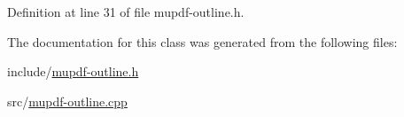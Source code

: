 Definition at line 31 of file mupdf-\/outline.\-h.



The documentation for this class was generated from the following files\-:\begin{DoxyCompactItemize}
\item 
include/\hyperlink{mupdf-outline_8h}{mupdf-\/outline.\-h}\item 
src/\hyperlink{mupdf-outline_8cpp}{mupdf-\/outline.\-cpp}\end{DoxyCompactItemize}
